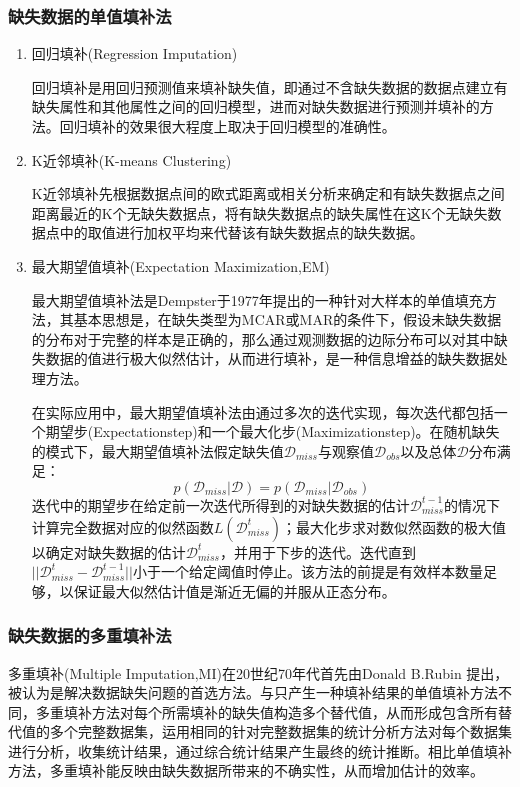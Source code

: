 \documentclass[a4paper]{ctexart}
\begin{document}
\subsubsection{缺失数据的单值填补法}\label{subsec:单值填补}
\begin{enumerate}
	\item 回归填补(Regression Imputation)\cite{RN173}

	      回归填补是用回归预测值来填补缺失值，即通过不含缺失数据的数据点建立有缺失属性和其他属性之间的回归模型，进而对缺失数据进行预测并填补的方法。回归填补的效果很大程度上取决于回归模型的准确性。

	\item K近邻填补(K-means Clustering)\cite{RN174,RN175}

	      K近邻填补先根据数据点间的欧式距离或相关分析来确定和有缺失数据点之间距离最近的K个无缺失数据点，将有缺失数据点的缺失属性在这K个无缺失数据点中的取值进行加权平均来代替该有缺失数据点的缺失数据。

	\item 最大期望值填补(Expectation Maximization,EM)\cite{RN169,RN170,RN171}

	      最大期望值填补法是Dempster于1977年提出的一种针对大样本的单值填充方法，其基本思想是，在缺失类型为MCAR或MAR的条件下，假设未缺失数据的分布对于完整的样本是正确的，那么通过观测数据的边际分布可以对其中缺失数据的值进行极大似然估计，从而进行填补，是一种信息增益的缺失数据处理方法。

	      在实际应用中，最大期望值填补法由通过多次的迭代实现，每次迭代都包括一个期望步(Expectationstep)和一个最大化步(Maximizationstep)。在随机缺失的模式下，最大期望值填补法假定缺失值$\mathcal{D}_{miss}$与观察值$\mathcal{D}_{obs}$以及总体$\mathcal{D}$分布满足：
	      \begin{equation}
		      p\left(\mathcal{D}_{miss}|\mathcal{D}\right)=p\left(\mathcal{D}_{miss}|\mathcal{D}_{obs}\right)
	      \end{equation}
	      迭代中的期望步在给定前一次迭代所得到的对缺失数据的估计$\mathcal{D}_{miss}^{t-1}$的情况下计算完全数据对应的似然函数$L\left(\mathcal{D}_{miss}^{t}\right)$；最大化步求对数似然函数的极大值以确定对缺失数据的估计$\mathcal{D}_{miss}^{t}$，并用于下步的迭代。迭代直到$||\mathcal{D}_{miss}^{t}-\mathcal{D}_{miss}^{t-1}||$小于一个给定阈值时停止。该方法的前提是有效样本数量足够，以保证最大似然估计值是渐近无偏的并服从正态分布。

\end{enumerate}

\subsubsection{缺失数据的多重填补法}\label{subsec:多重填补}
多重填补(Multiple Imputation,MI)在20世纪70年代首先由Donald B.Rubin 提出，被认为是解决数据缺失问题的首选方法。与只产生一种填补结果的单值填补方法不同，多重填补方法对每个所需填补的缺失值构造多个替代值，从而形成包含所有替代值的多个完整数据集，运用相同的针对完整数据集的统计分析方法对每个数据集进行分析，收集统计结果，通过综合统计结果产生最终的统计推断。相比单值填补方法，多重填补能反映由缺失数据所带来的不确实性，从而增加估计的效率\cite{RN172}。
\end{document}
